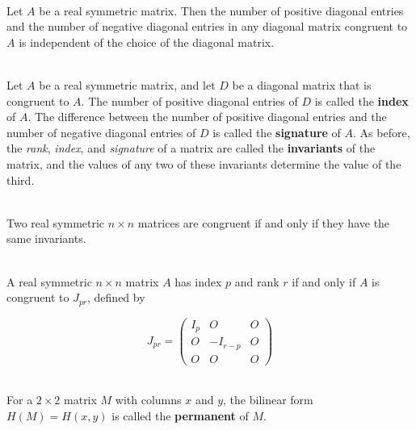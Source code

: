 \begin{corollary}
	\hfill\\
	Let $A$ be a real symmetric matrix. Then the number of positive diagonal entries and the number of negative diagonal entries in any diagonal matrix congruent to $A$ is independent of the choice of the diagonal matrix.
\end{corollary}

\begin{definition}
	\hfill\\
	Let $A$ be a real symmetric matrix, and let $D$ be a diagonal matrix that is congruent to $A$. The number of positive diagonal entries of $D$ is called the \textbf{index} of $A$. The difference between the number of positive diagonal entries and the number of negative diagonal entries of $D$ is called the \textbf{signature} of $A$. As before, the \textit{rank}, \textit{index}, and \textit{signature} of a matrix are called the \textbf{invariants} of the matrix, and the values of any two of these invariants determine the value of the third.
\end{definition}

\begin{corollary}
	\hfill\\
	Two real symmetric $n \times n$ matrices are congruent if and only if they have the same invariants.
\end{corollary}

\begin{corollary}
	\hfill\\
	A real symmetric $n \times n$ matrix $A$ has index $p$ and rank $r$ if and only if $A$ is congruent to $J_{pr}$, defined by

	\[J_{pr} = \begin{pmatrix}
			I_p & O        & O \\
			O   & -I_{r-p} & O \\
			O   & O        & O
		\end{pmatrix}\]
\end{corollary}

\begin{definition}
	\hfill\\
	For a $2 \times 2$ matrix $M$ with columns $x$ and $y$, the bilinear form $H(M)=H(x,y)$ is called the \textbf{permanent} of $M$.
\end{definition}
